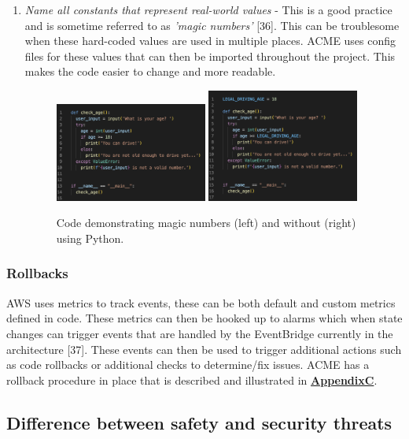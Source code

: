 \begin{enumerate}
    \item \textit{Name all constants that represent real-world values} - This is a good practice and is sometime referred to as \textit{'magic numbers'} [36].
    This can be troublesome when these hard-coded values are used in multiple places. ACME uses config files for these values that can then be imported 
    throughout the project. This makes the code easier to change and more readable.

    \begin{figure}[H]
      \centering
      \includegraphics[width=5cm]{assets/magicNumbers.png}
      \includegraphics[width=5cm]{assets/noMagicNumbers.png}
      \caption{Code demonstrating magic numbers (left) and without (right) using Python.}
      \label{fig:magicNumbers}
    \end{figure}

  \end{enumerate}


  \subsubsection{Rollbacks}
  \label{sec:Rollbacks}
  AWS uses metrics to track events, these can be both default and custom metrics defined in code. These metrics can then be hooked up to alarms which 
  when state changes can trigger events that are handled by the EventBridge currently in the architecture [37]. These events can then be used to trigger
  additional actions such as code rollbacks or additional checks to determine/fix issues. ACME has a rollback procedure in place that is described and
  illustrated in \hyperref[sec:AppendixC]{\textbf{AppendixC}}.
  
  \subsection{Difference between safety and security threats}

